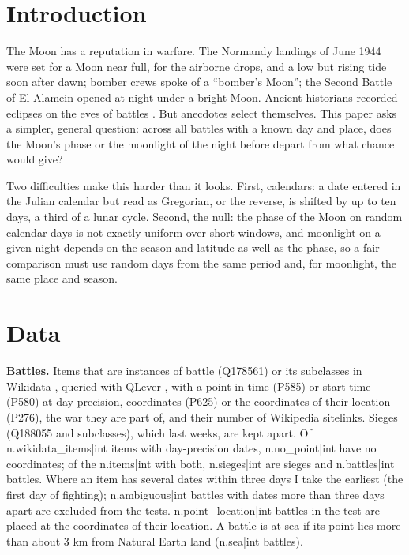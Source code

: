 \documentclass[11pt,a4paper]{article}
\begin{document}
\section{Introduction}
The Moon has a reputation in warfare. The Normandy landings of June 1944 were set for a Moon near full, for the airborne drops, and a low but rising tide soon after dawn; bomber crews spoke of a ``bomber's Moon''; the Second Battle of El Alamein opened at night under a bright Moon. Ancient historians recorded eclipses on the eves of battles \citep{livy,herodotus}. But anecdotes select themselves. This paper asks a simpler, general question: across all battles with a known day and place, does the Moon's phase or the moonlight of the night before depart from what chance would give?

Two difficulties make this harder than it looks. First, calendars: a date entered in the Julian calendar but read as Gregorian, or the reverse, is shifted by up to ten days, a third of a lunar cycle. Second, the null: the phase of the Moon on random calendar days is not exactly uniform over short windows, and moonlight on a given night depends on the season and latitude as well as the phase, so a fair comparison must use random days from the same period and, for moonlight, the same place and season.

\section{Data}
\textbf{Battles.} Items that are instances of battle (Q178561) or its subclasses in Wikidata \citep{wikidata}, queried with QLever \citep{qlever}, with a point in time (P585) or start time (P580) at day precision, coordinates (P625) or the coordinates of their location (P276), the war they are part of, and their number of Wikipedia sitelinks. Sieges (Q188055 and subclasses), which last weeks, are kept apart. Of {{n.wikidata_items|int}} items with day-precision dates, {{n.no_point|int}} have no coordinates; of the {{n.items|int}} with both, {{n.sieges|int}} are sieges and {{n.battles|int}} battles. Where an item has several dates within three days I take the earliest (the first day of fighting); {{n.ambiguous|int}} battles with dates more than three days apart are excluded from the tests. {{n.point_location|int}} battles in the test are placed at the coordinates of their location. A battle is at sea if its point lies more than about 3 km from Natural Earth land ({{n.sea|int}} battles).
\end{document}
